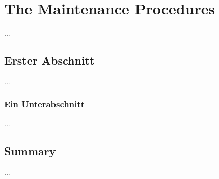 
\chapter{The  Maintenance Procedures}
\label{cha:Maintenance}

...


\section{Erster Abschnitt}

...

\subsection{Ein Unterabschnitt}

...



\section{Summary}

...
